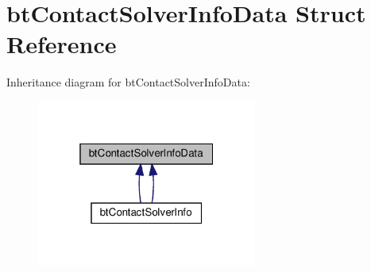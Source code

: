 \hypertarget{structbtContactSolverInfoData}{}\section{bt\+Contact\+Solver\+Info\+Data Struct Reference}
\label{structbtContactSolverInfoData}


Inheritance diagram for bt\+Contact\+Solver\+Info\+Data\+:
\nopagebreak
\begin{figure}[H]
\begin{center}
\leavevmode
\includegraphics[width=205pt]{structbtContactSolverInfoData__inherit__graph}
\end{center}
\end{figure}
